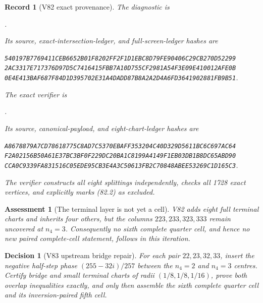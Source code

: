 \documentclass[11pt,oneside]{article}
\newtheorem{assessment}[theorem]{Assessment}
\newtheorem{record}[theorem]{Record}
\newtheorem{decision}[theorem]{Decision}
\theoremstyle{definition}
\theoremstyle{remark}
\begin{document}
\begin{record}[V82 exact provenance]
\label{rec:newv82-provenance}
The diagnostic is
\begin{center}\footnotesize
{}.
\end{center}
Its source, exact-intersection-ledger, and full-screen-ledger hashes
are
\begin{center}\scriptsize
\texttt{540197B7769411CEB6652B01F8202FF2F1D1EBC8D79FE90406C29CB270D52299}\\
\texttt{2AC3317E717376D97D5C7416415FBB7A10D755CF2981A54F3E09E410012AFE0B}\\
\texttt{0E4E413BAF687F84D1D395702E31A4DADD87B8A2A2D4A6FD3641902881FB9B51}.
\end{center}
The exact verifier is
\begin{center}\footnotesize
{}.
\end{center}
Its source, canonical-payload, and eight-chart-ledger hashes are
\begin{center}\scriptsize
\texttt{A8678879A7CD78618775C8AD7C5370EBAFF353204C40D329D5611BC6C697AC64}\\
\texttt{F2A02156B50A61E37BC3BF0F229DC20BA1C8199A4149F1EB03DB1B8DC65ABD90}\\
\texttt{CCA0C9339FA831516C05EDE95CB3E4A3C50613FB2C70848ABEE53269C1D165C3}.
\end{center}
The verifier constructs all eight splittings independently, checks
all 1728 exact vertices, and explicitly marks (82.2) as excluded.
\end{record}

\begin{assessment}[The terminal layer is not yet a cell]
\label{ass:newv82}
V82 adds eight full terminal charts and inherits four others, but
the columns \(223,233,323,333\) remain uncovered at \(n_4=3\).
Consequently no sixth complete quarter cell, and hence no new paired
complete-cell statement, follows in this iteration.
\end{assessment}

\begin{decision}[V83 upstream bridge repair]
\label{dec:newv82-next}
For each pair \(22,23,32,33\), insert the negative half-step phase
\((255-32i)/257\) between the \(n_4=2\) and \(n_4=3\) centres.
Certify bridge and small terminal charts of radii
\((1/8,1/8,1/16)\), prove both overlap inequalities exactly, and
only then assemble the sixth complete quarter cell and its
inversion-paired fifth cell.
\end{decision}
\end{document}
